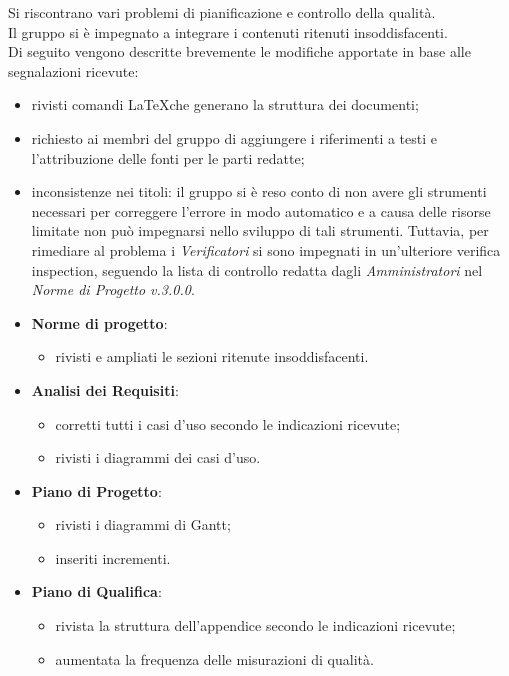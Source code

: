		Si riscontrano vari problemi di pianificazione e controllo della qualità. \\
		Il gruppo si è impegnato a integrare i contenuti ritenuti insoddisfacenti.\\ 
		 Di seguito vengono descritte brevemente le modifiche apportate in base alle segnalazioni ricevute:
	\begin{itemize}
		\item rivisti comandi \LaTeX \space che generano la struttura dei documenti;
		\item richiesto ai membri del gruppo di aggiungere i riferimenti a testi e l'attribuzione delle fonti per le parti redatte;
		\item inconsistenze nei titoli: il gruppo si è reso conto di non avere gli strumenti necessari per correggere l'errore in modo automatico e a causa delle risorse limitate non può impegnarsi nello sviluppo di tali strumenti. Tuttavia, per rimediare al problema i \textit{Verificatori} si sono impegnati in un'ulteriore verifica inspection\glo, seguendo la lista di controllo redatta dagli \textit{Amministratori} nel \textit{Norme di Progetto v.3.0.0}. 
		\item \textbf{Norme di progetto}: 
			\begin{itemize}	
				\item rivisti e ampliati le sezioni ritenute insoddisfacenti.
			\end{itemize}
		\item \textbf{Analisi dei Requisiti}: 
			\begin{itemize}
				\item corretti tutti i casi d'uso secondo le indicazioni ricevute;
				\item rivisti i diagrammi dei casi d'uso.
			\end{itemize} 
		\item \textbf{Piano di Progetto}: 
			\begin{itemize}
				\item rivisti i diagrammi di Gantt;
				\item inseriti incrementi.
			\end{itemize}
		\item \textbf{Piano di Qualifica}: 
			\begin{itemize}
				\item rivista la struttura dell'appendice secondo le indicazioni ricevute;
				\item aumentata la frequenza delle misurazioni di qualità.
			\end{itemize}
	\end{itemize}
	
